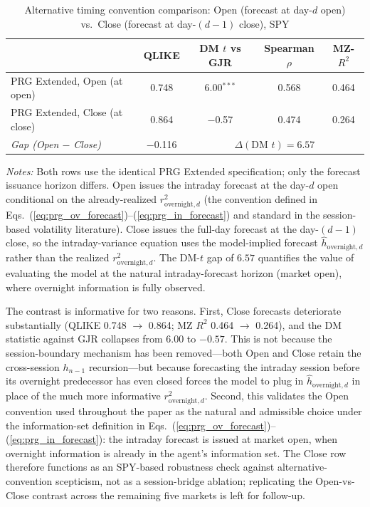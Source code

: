 \documentclass[11pt,a4paper]{article}
\begin{document}
\begin{table}[htbp]
\centering
\caption{Alternative timing convention comparison: Open (forecast at day-$d$ open) vs.\ Close (forecast at day-$(d-1)$ close), SPY}
\label{tab:ablation}
\small
\begin{tabular}{lcccc}
\toprule
 & QLIKE & DM $t$ vs GJR & Spearman $\rho$ & MZ-$R^2$ \\
\midrule
PRG Extended, Open (at open)   & 0.748 & 6.00$^{***}$ & 0.568 & 0.464 \\
PRG Extended, Close (at close) & 0.864 & $-$0.57      & 0.474 & 0.264 \\[2pt]
\emph{Gap (Open $-$ Close)} & $-$0.116 & \multicolumn{3}{c}{$\Delta(\text{DM } t) = 6.57$} \\
\bottomrule
\end{tabular}
\begin{flushleft}
\footnotesize
\emph{Notes:} Both rows use the identical PRG Extended specification; only the forecast issuance horizon differs. Open issues the intraday forecast at the day-$d$ open conditional on the already-realized $r^2_{\text{overnight},d}$ (the convention defined in Eqs.~(\ref{eq:prg_ov_forecast})--(\ref{eq:prg_in_forecast}) and standard in the session-based volatility literature). Close issues the full-day forecast at the day-$(d-1)$ close, so the intraday-variance equation uses the model-implied forecast $\hat h_{\text{overnight},d}$ rather than the realized $r^2_{\text{overnight},d}$. The DM-$t$ gap of $6.57$ quantifies the value of evaluating the model at the natural intraday-forecast horizon (market open), where overnight information is fully observed.
\end{flushleft}
\end{table}

The contrast is informative for two reasons. First, Close forecasts deteriorate substantially (QLIKE 0.748 $\to$ 0.864; MZ $R^2$ 0.464 $\to$ 0.264), and the DM statistic against GJR collapses from $6.00$ to $-0.57$. This is not because the session-boundary mechanism has been removed---both Open and Close retain the cross-session $h_{n-1}$ recursion---but because forecasting the intraday session before its overnight predecessor has even closed forces the model to plug in $\hat h_{\text{overnight},d}$ in place of the much more informative $r^2_{\text{overnight},d}$. Second, this validates the Open convention used throughout the paper as the natural and admissible choice under the information-set definition in Eqs.~(\ref{eq:prg_ov_forecast})--(\ref{eq:prg_in_forecast}): the intraday forecast is issued at market open, when overnight information is already in the agent's information set. The Close row therefore functions as an SPY-based robustness check against alternative-convention scepticism, not as a session-bridge ablation; replicating the Open-vs-Close contrast across the remaining five markets is left for follow-up.
\end{document}
